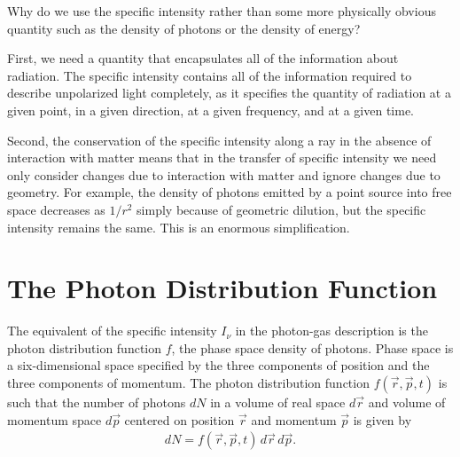 Why do we use the specific intensity rather than some more physically
obvious quantity such as the density of photons or the density of
energy? 

\newslide

First, we need a quantity that encapsulates all of the information about
radiation. The specific intensity contains all of the information
required to describe unpolarized light completely, as it specifies the
quantity of radiation at a given point, in a given direction, at a given
frequency, and at a given time.

\newslide

Second, the conservation of the specific intensity along a ray in the
absence of interaction with matter means that in the transfer of
specific intensity we need only consider changes due to interaction with
matter and ignore changes due to geometry. For example, the density of
photons emitted by a point source into free space decreases as $1/r^2$
simply because of geometric dilution, but the specific intensity remains
the same. This is an enormous simplification.

\newslide

\section{The Photon Distribution Function}

The equivalent of the specific intensity $I_\nu$ in the photon-gas
description is the photon distribution function $f$, the phase space
density of photons. Phase space is a six-dimensional space specified by
the three components of position and the three components of momentum.
The photon distribution function $f(\vec r, \vec p, t)$ is such that the
number of photons $dN$ in a volume of real space $d \vec r$ and volume of
momentum space $d\vec p$ centered on position $\vec r$ and momentum
$\vec p$ is given by
\begin{align}
dN = f(\vec r, \vec p, t)\,d\vec r\,d\vec p.
\end{align}

\newslide

